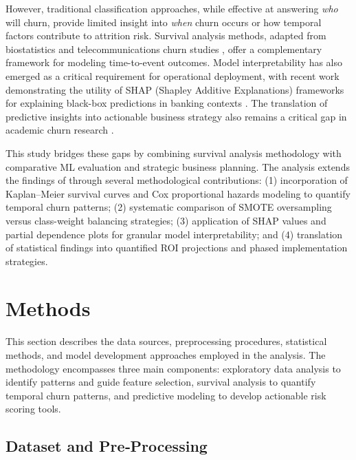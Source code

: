 \documentclass[12pt]{article}
\begin{document}
However, traditional classification approaches, while effective at answering \emph{who} will churn, provide limited insight into \emph{when} churn occurs or how temporal factors contribute to attrition risk. Survival analysis methods, adapted from biostatistics and telecommunications churn studies \citep{desai_customer_survival}, offer a complementary framework for modeling time-to-event outcomes. Model interpretability has also emerged as a critical requirement for operational deployment, with recent work demonstrating the utility of SHAP (Shapley Additive Explanations) frameworks for explaining black-box predictions in banking contexts \citep{peng2023interpretability}. The translation of predictive insights into actionable business strategy also remains a critical gap in academic churn research \citep{brito2024framework}.

This study bridges these gaps by combining survival analysis methodology with comparative ML evaluation and strategic business planning. The analysis extends the findings of \citet{singh2024productchurn} through several methodological contributions: (1) incorporation of Kaplan–Meier survival curves and Cox proportional hazards modeling to quantify temporal churn patterns; (2) systematic comparison of SMOTE oversampling versus class-weight balancing strategies; (3) application of SHAP values and partial dependence plots for granular model interpretability; and (4) translation of statistical findings into quantified ROI projections and phased implementation strategies.

\section{Methods}
This section describes the data sources, preprocessing procedures, statistical methods, and model development approaches employed in the analysis. The methodology encompasses three main components: exploratory data analysis to identify patterns and guide feature selection, survival analysis to quantify temporal churn patterns, and predictive modeling to develop actionable risk scoring tools.

\subsection{Dataset and Pre‑Processing}
\end{document}
